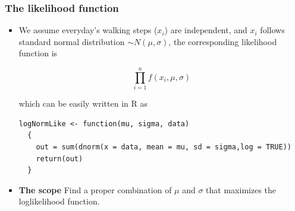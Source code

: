 \documentclass[10pt]{beamer}
\begin{document}
\begin{frame}[fragile]
  \frametitle{The likelihood function}

  \begin{itemize}
  \item We assume everyday's walking steps ($x_i$) are independent, and  $x_i$ follows
    standard normal distribution $\sim
    N(\mu,\sigma)$, the corresponding likelihood function is

    \begin{equation*}
      \prod_{i=1}^n f(x_i,\mu,\sigma)
    \end{equation*}

    which can be easily written in R as
\begin{verbatim}
logNormLike <- function(mu, sigma, data)
  {
    out = sum(dnorm(x = data, mean = mu, sd = sigma,log = TRUE))
    return(out)
  }
\end{verbatim}


  \item \textbf{The scope} Find a proper combination of $\mu$ and $\sigma$ that maximizes the
    loglikelihood function.

  \end{itemize}
\end{frame}
\end{document}
